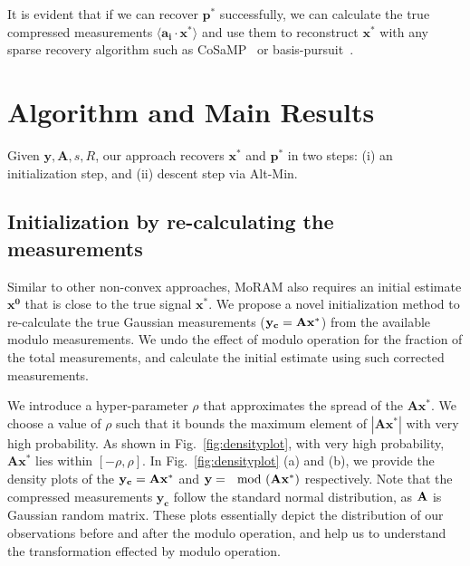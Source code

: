 It is evident that if we can recover $\mathbf{p^*}$ successfully, we can calculate the true compressed measurements $\langle \mathbf{a_i} \cdot \mathbf{x^*} \rangle$ and use them to reconstruct $\mathbf{x^*}$ with any sparse recovery algorithm such as CoSaMP~\cite{needell2010cosamp} or basis-pursuit~\cite{chen2001atomic}.

\section{Algorithm and Main Results}
Given $\mathbf{y, A}, s, R$, our approach recovers $\mathbf{x^*}$ and $\mathbf{p^*}$ in two steps: (i) an initialization step, and (ii) descent step via Alt-Min.

\subsection{Initialization by re-calculating the measurements}
\label{sec:init}	
Similar to other non-convex approaches, MoRAM also requires an initial estimate $\mathbf{{x}^0}$ that is close to the true signal $\mathbf{{x}^*}$. We propose a novel initialization method to re-calculate the true Gaussian measurements ($\mathbf{y_c}= \mathbf{Ax^*}$) from the available modulo measurements. We undo the effect of modulo operation for the fraction of the total measurements, and calculate the initial estimate using such corrected measurements.

We introduce a hyper-parameter $\rho$ that approximates the spread of the $\mathbf{Ax^*}$. We choose a value of $\rho$ such that it bounds the maximum element of $|\mathbf{Ax^*}|$ with very high probability. As shown in Fig.~\ref{fig:densityplot}, with very high probability, $\mathbf{Ax^*}$ lies within $[-\rho, \rho]$. In Fig.~\ref{fig:densityplot} (a) and (b), we provide the density plots of the $\mathbf{y_c} = \mathbf{Ax^*}$ and $\mathbf{y} = \mathbf{\mod(\mathbf{Ax^*})}$ respectively. Note that the compressed measurements $\mathbf{y_c}$ follow the standard normal distribution, as $\mathbf{A}$ is Gaussian random matrix. These plots essentially depict the distribution of our observations before and after the modulo operation, and help us to understand the transformation effected by modulo operation. %

